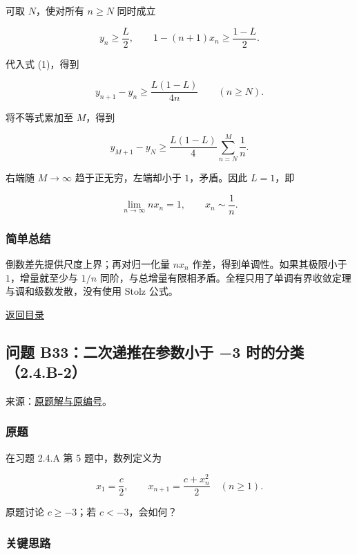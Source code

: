 \documentclass[11pt,a4paper]{article}
\begin{document}
可取 \(N\)，使对所有 \(n\ge N\) 同时成立

\[
y_n\ge\frac L2,\qquad
1-(n+1)x_n\ge\frac{1-L}{2}.
\]

代入式 (1)，得到

\[
y_{n+1}-y_n\ge\frac{L(1-L)}{4n}\qquad(n\ge N).
\]

将不等式累加至 \(M\)，得到

\[
y_{M+1}-y_N
\ge\frac{L(1-L)}4\sum_{n=N}^{M}\frac1n.
\]

右端随 \(M\to\infty\) 趋于正无穷，左端却小于 \(1\)，矛盾。因此
\(L=1\)，即

\[
\boxed{\lim_{n\to\infty}nx_n=1,\qquad x_n\sim\frac1n.}
\]

\subsubsection{简单总结}\label{ux7b80ux5355ux603bux7ed3}

倒数差先提供尺度上界；再对归一化量 \(nx_n\)
作差，得到单调性。如果其极限小于 \(1\)，增量就至少与 \(1/n\)
同阶，与总增量有限相矛盾。全程只用了单调有界收敛定理与调和级数发散，没有使用
Stolz 公式。

\noindent\hyperref[contents]{返回目录}

\subsection{问题 B33：二次递推在参数小于 −3
时的分类（2.4.B-2）}\label{ux95eeux9898-b33ux4e8cux6b21ux9012ux63a8ux5728ux53c2ux6570ux5c0fux4e8e-3-ux65f6ux7684ux5206ux7c7b2.4.b-2}

来源：\href{https://zj139.github.io/math-notes/problems/e7f87e98efda5bacdd444c79/\#问题-b33}{原题解与原编号}。

\subsubsection{原题}\label{ux539fux9898-1}

在习题 2.4.A 第 5 题中，数列定义为

\[
x_1=\frac c2,\qquad x_{n+1}=\frac{c+x_n^2}{2}\quad(n\ge1).
\]

原题讨论 \(c\ge-3\)；若 \(c<-3\)，会如何？

\subsubsection{关键思路}\label{ux5173ux952eux601dux8def-1}
\end{document}

